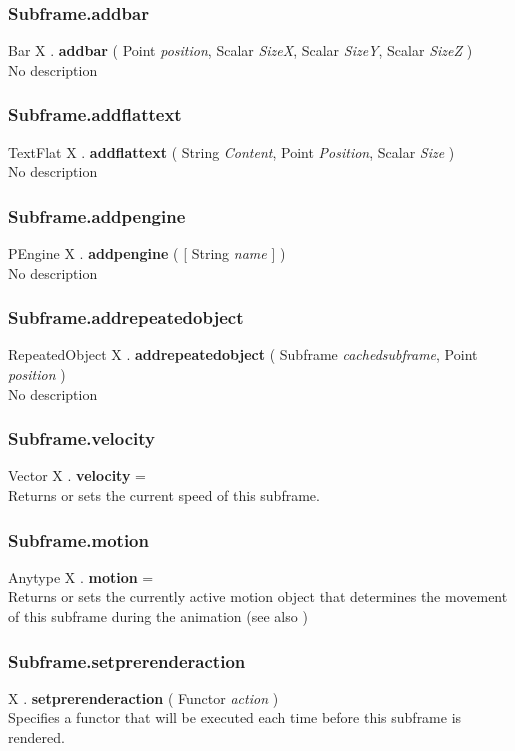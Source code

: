 \subsubsection{Subframe.addbar \label{F:Subframe:addbar}}
Bar X . \textbf{addbar} ( Point \textit{position}, Scalar \textit{SizeX}, Scalar \textit{SizeY}, Scalar \textit{SizeZ} ) \\
No description

\subsubsection{Subframe.addflattext \label{F:Subframe:addflattext}}
TextFlat X . \textbf{addflattext} ( String \textit{Content}, Point \textit{Position}, Scalar \textit{Size} ) \\
No description

\subsubsection{Subframe.addpengine \label{F:Subframe:addpengine}}
PEngine X . \textbf{addpengine} (  [ String \textit{name} ] ) \\
No description

\subsubsection{Subframe.addrepeatedobject \label{F:Subframe:addrepeatedobject}}
RepeatedObject X . \textbf{addrepeatedobject} ( Subframe \textit{cachedsubframe}, Point \textit{position} ) \\
No description

\subsubsection{Subframe.velocity \label{F:Subframe:velocity}}
Vector X . \textbf{velocity} = \\
Returns or sets the current speed of this subframe.

\subsubsection{Subframe.motion \label{F:Subframe:motion}}
Anytype X . \textbf{motion} = \\
Returns or sets the currently active motion object that determines the movement of this subframe during the animation (see also )

\subsubsection{Subframe.setprerenderaction \label{F:Subframe:setprerenderaction}}
X . \textbf{setprerenderaction} ( Functor \textit{action} ) \\
Specifies a functor that will be executed each time before this subframe is rendered.

